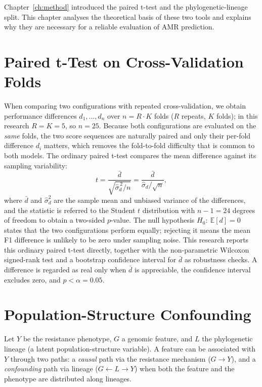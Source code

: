 \documentclass[../main.tex]{subfiles}
\begin{document}
Chapter~\ref{ch:method} introduced the paired t-test and the phylogenetic-lineage split. This chapter analyses the theoretical basis of these two tools and explains why they are necessary for a reliable evaluation of AMR prediction.

\section{Paired t-Test on Cross-Validation Folds}

When comparing two configurations with repeated cross-validation, we obtain performance differences $d_1,\dots,d_n$ over $n = R\cdot K$ folds ($R$ repeats, $K$ folds); in this research $R = K = 5$, so $n = 25$. Because both configurations are evaluated on the \emph{same} folds, the two score sequences are naturally paired and only their per-fold difference $d_i$ matters, which removes the fold-to-fold difficulty that is common to both models. The ordinary paired t-test compares the mean difference against its sampling variability:
\begin{equation}
t = \frac{\bar{d}}{\sqrt{\hat{\sigma}_d^{\,2}/n}} = \frac{\bar{d}}{\hat{\sigma}_d/\sqrt{n}},
\end{equation}
where $\bar{d}$ and $\hat{\sigma}_d^{2}$ are the sample mean and unbiased variance of the differences, and the statistic is referred to the Student $t$ distribution with $n-1 = 24$ degrees of freedom to obtain a two-sided $p$-value. The null hypothesis $H_0:\ \mathbb{E}[d]=0$ states that the two configurations perform equally; rejecting it means the mean F1 difference is unlikely to be zero under sampling noise. This research reports this ordinary paired t-test directly, together with the non-parametric Wilcoxon signed-rank test and a bootstrap confidence interval for $\bar{d}$ as robustness checks. A difference is regarded as real only when $\bar{d}$ is appreciable, the confidence interval excludes zero, and $p < \alpha = 0.05$.

\section{Population-Structure Confounding}

Let $Y$ be the resistance phenotype, $G$ a genomic feature, and $L$ the phylogenetic lineage (a latent population-structure variable). A feature can be associated with $Y$ through two paths: a \textit{causal} path via the resistance mechanism ($G \to Y$), and a \textit{confounding} path via lineage ($G \leftarrow L \to Y$) when both the feature and the phenotype are distributed along lineages.
\end{document}
